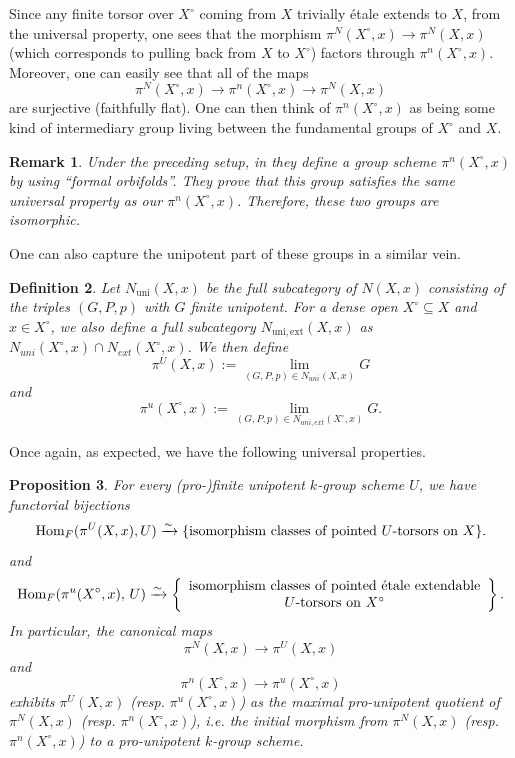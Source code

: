 \documentclass[a4paper,english,12pt]{amsart}
\newtheorem{definition}{Definition}[section]
\newtheorem{proposition}[definition]{Proposition}
\newtheorem{remark}[definition]{Remark}
\numberwithin{equation}{section}
\newcommand{\Hom}{\textup{Hom}}
\renewcommand{\_}{\rule{0.25cm}{0.4pt}}
\begin{document}
Since any finite torsor over $X^{\circ}$ coming from $X$ trivially étale extends to $X$, from the universal property, one sees that the morphism $\pi^N(X^{\circ},x)\to \pi^{N}(X,x)$ (which corresponds to pulling back from $X$ to $X^{\circ}$) factors through $\pi^{n}(X^{\circ},x)$. Moreover, one can easily see that all of the maps
\[
\pi^{N}(X^{\circ},x)\to\pi^{n}(X^{\circ},x)\to\pi^{N}(X,x)
\]
are surjective (faithfully flat). One can then think of $\pi^{n}(X^{\circ},x)$ as being some kind of intermediary group living between the fundamental groups of $X^{\circ}$ and $X$.

\begin{remark}
Under the preceding setup, in \cite{Biswas2022-dg} they define a group scheme $\pi^{n}(X^{\circ},x)$ by using ``formal orbifolds''. They prove that this group satisfies the same universal property as our $\pi^{n}(X^{\circ},x)$. Therefore, these two groups are isomorphic.
\end{remark}

One can also capture the unipotent part of these groups in a similar vein.

\begin{definition}
Let $N_{\mathrm{uni}}(X,x)$ be the full subcategory of $N(X,x)$ consisting of the triples $(G,P,p)$ with $G$ finite unipotent. For a dense open $X^{\circ}\subseteq X$ and $x\in X^{\circ}$, we also define a full subcategory $N_{\mathrm{uni, ext}}(X,x)$ as $N_{uni}(X^{\circ},x)\cap N_{ext}(X^{\circ},x)$. We then define
\[
\pi^{U}(X,x):=\lim_{(G,P,p)\in N_{uni}(X,x)} G
\]
and
\[
\pi^{u}(X^{\circ},x):=\lim_{(G,P,p)\in N_{uni, ext}(X^{\circ},x)} G.
\]
\end{definition}

Once again, as expected, we have the following universal properties.

\begin{proposition}
For every (pro-)finite unipotent $k$-group scheme $U$, we have functorial bijections
\[
\Hom_{F}(\pi^{U}(X,x),U)\xrightarrow{\sim}
\{\text{isomorphism classes of pointed }U\text{-torsors on }X\}.
\]
and
\[
\Hom_{F}(\pi^{u}(X^{\circ},x),\,U)\xrightarrow{\sim} \left\{
\begin{array}{c}
\text{isomorphism classes of pointed étale extendable}\\
\text{$U$-torsors on $X^{\circ}$}
\end{array}
\right\}.
\]
In particular, the canonical maps
\[
\pi^{N}(X,x)\to \pi^{U}(X,x)
\]
and
\[
\pi^{n}(X^{\circ},x)\to \pi^{u}(X^{\circ},x)
\]
exhibits
$\pi^{U}(X,x)$ (resp. $\pi^{u}(X^{\circ},x)$) as the maximal pro-unipotent quotient of $\pi^{N}(X,x)$ (resp. $\pi^{n}(X^{\circ},x)$), i.e. the initial morphism from $\pi^{N}(X,x)$ (resp. $\pi^{n}(X^{\circ},x)$) to a pro-unipotent $k$-group scheme.
\end{proposition}
\end{document}
